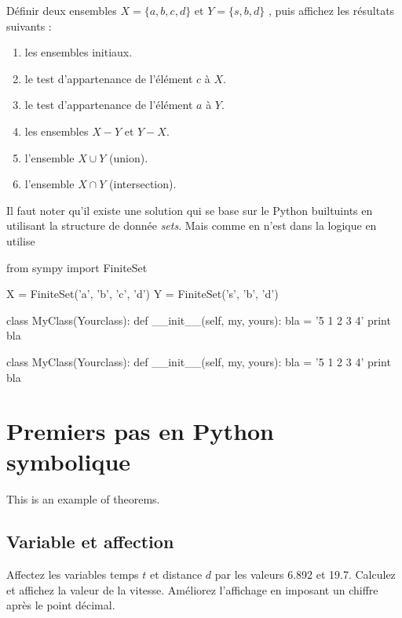 \documentclass[11pt,fleqn]{book} %
\begin{document}
\begin{exercise}
		Définir deux ensembles $X = \lbrace a, b, c, d\rbrace$ et  $Y = \lbrace s, b, d\rbrace$ , puis 			affichez les résultats suivants :
 		\begin{enumerate}
  			 \item les ensembles initiaux.
  			 \item le test d’appartenance de l’élément $c$ à $X$.
  			 \item le test d’appartenance de l’élément $a$ à $Y$.
  			 \item les ensembles $X - Y$ et $Y - X$.
  			 \item l’ensemble $X \cup Y$ (union).
  			 \item l'ensemble $X \cap Y$ (intersection).
	 \end{enumerate}
\end{exercise}

\begin{solution}
Il faut noter qu'il existe une solution qui se base sur le Python builtuints en utilisant la structure de donnée \textit{sets}. Mais comme en n'est dans la logique en utilise 
\begin{python}
from sympy import FiniteSet

X = FiniteSet('a', 'b', 'c', 'd')
Y = FiniteSet('s', 'b', 'd')

class MyClass(Yourclass):
    def __init__(self, my, yours):
        bla = '5 1 2 3 4'
        print bla
\end{python}
\begin{python}
class MyClass(Yourclass):
    def __init__(self, my, yours):
        bla = '5 1 2 3 4'
        print bla
\end{python}

\end{solution}
\section{Premiers pas en Python symbolique}

This is an example of theorems.

\subsection{Variable et affection}

\begin{exercise}
Affectez les variables temps $t$ et distance $d$ par les valeurs 6.892 et 19.7. Calculez et affichez la valeur de la vitesse. Améliorez l’affichage en imposant un chiffre après le point décimal.
\end{exercise}
\end{document}
